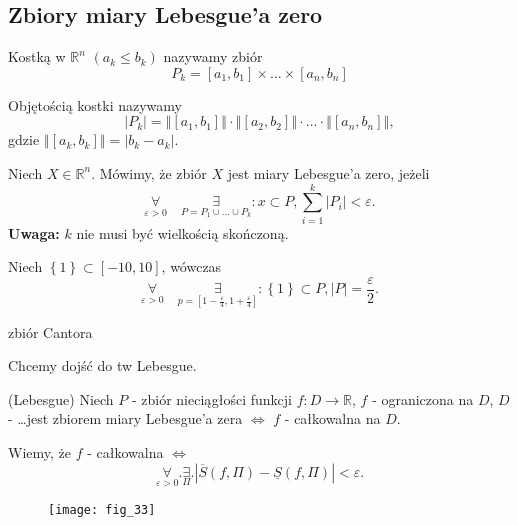 \documentclass[../main.tex]{subfiles}
\begin{document}
\subsection{Zbiory miary Lebesgue'a zero}

\begin{definicja}
Kostką w $\mathbb{R}^n$ $(a_k \le b_k)$ nazywamy zbiór
\[
    P_k = \left[ a_1,b_1 \right] \times \ldots \times \left[ a_n, b_n \right]
\]
\end{definicja}

\begin{definicja}
    Objętością kostki nazywamy
    \[
        |P_k| = \left\Vert \left[ a_1, b_1 \right]  \right\Vert \cdot \left\Vert \left[ a_2, b_2 \right]  \right\Vert \cdot \ldots\cdot \left\Vert \left[ a_n, b_n \right]  \right\Vert
    ,\]
gdzie $\left\Vert \left[ a_k, b_k \right]  \right\Vert = \left| b_k - a_k \right| $.
\end{definicja}

\begin{definicja}
    Niech $X\in \mathbb{R}^n$. Mówimy, że zbiór $X$ jest miary Lebesgue'a zero, jeżeli
    \[
    \underset{\varepsilon > 0}{\forall}\quad \underset{P = P_1 \cup \ldots \cup P_k}{\exists} : x \subset P, \sum_{i=1}^{k} \left| P_i \right| < \varepsilon
    .\]
\textbf{Uwaga:} $k$ nie musi być wielkością skończoną.
\end{definicja}

\begin{przyklad}
    Niech $\left\{ 1 \right\} \subset \left[ -10, 10 \right] $,
    wówczas
    \[
        \underset{\varepsilon > 0}{\forall} \quad \underset{p = \left[ 1 - \frac{\varepsilon}{4}, 1 + \frac{\varepsilon}{4} \right] }{\exists} : \left\{ 1 \right\} \subset P, \left| P \right|  = \frac{\varepsilon}{2}
    .\]
\end{przyklad}
\begin{przyklad}
    zbiór Cantora\\

\end{przyklad}

    Chcemy dojść do tw Lebesgue.
    \begin{tw}
        (Lebesgue) Niech $P$ - zbiór nieciągłości funkcji $f: D\to\mathbb{R}$, $f$ - ograniczona na $D$, $D$ - \ldots jest zbiorem miary Lebesgue'a zera  $\iff$ $f$ - całkowalna na $D$.
    \end{tw}

    Wiemy, że $f$ - całkowalna $\iff$
    \[
        \underset{\varepsilon>0}{\forall} .\underset{\Pi}{\exists}. |\overline{S}(f,\Pi) - \underline{S}(f,\Pi) | < \varepsilon
    .\]
    \begin{figure}[h]
        \centering
        \texttt{[image: fig\_33]}
    \end{figure}
\end{document}
